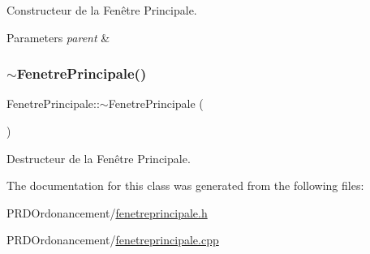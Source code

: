 Constructeur de la Fenêtre Principale. 


\begin{DoxyParams}{Parameters}
{\em parent} & \\
\hline
\end{DoxyParams}
\mbox{\label{classFenetrePrincipale_afb035ceb7a4f1ddd23ab6213b582efa1}} 
\subsubsection{\texorpdfstring{$\sim$\+Fenetre\+Principale()}{~FenetrePrincipale()}}
{\footnotesize\ttfamily Fenetre\+Principale\+::$\sim$\+Fenetre\+Principale (\begin{DoxyParamCaption}{ }\end{DoxyParamCaption})}



Destructeur de la Fenêtre Principale. 



The documentation for this class was generated from the following files\+:\begin{DoxyCompactItemize}
\item 
P\+R\+D\+Ordonancement/\hyperlink{fenetreprincipale_8h}{fenetreprincipale.\+h}\item 
P\+R\+D\+Ordonancement/\hyperlink{fenetreprincipale_8cpp}{fenetreprincipale.\+cpp}\end{DoxyCompactItemize}
